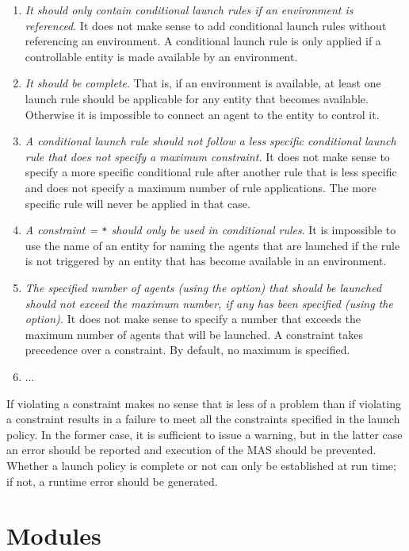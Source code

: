 \documentclass{article}
\begin{document}
\begin{enumerate}
\item \textit{It should only contain conditional launch rules if an environment is referenced}. It does not make sense to add conditional launch rules without referencing an environment. A conditional launch rule is only applied if a controllable  entity is made available by an environment.
\item \textit{It should be complete}. That is, if an environment is available, at least one launch rule should be applicable for any entity that becomes available. Otherwise it is impossible to connect an agent to the entity to control it.
\item \textit{A conditional launch rule should not follow a less specific conditional launch rule that does not specify a maximum constraint.} It does not make sense to specify a more specific conditional rule after another rule that is less specific and does not specify a maximum number of rule applications. The more specific rule will never be applied in that case.
\item \textit{A constraint \name = \texttt{*} should only be used in conditional rules}. It is impossible to use the name of an entity for naming the agents that are launched if the rule is not triggered by an entity that has become available in an environment.
\item \textit{The specified number of agents (using the \nr option) that should be launched should not exceed the maximum number, if any has been specified (using the \maxnr option).} It does not make sense to specify a number that exceeds the maximum number of agents that will be launched. A \maxnr constraint takes precedence over a \nr constraint. By default, no maximum is specified.
\item ...
\end{enumerate}

If violating a constraint makes no sense that is less of a problem than if violating a constraint results in a failure to meet all the constraints specified in the launch policy. In the former case, it is sufficient to issue a warning, but in the latter case an error should be reported and execution of the MAS should be prevented. Whether a launch policy is complete or not can only be established at run time; if not, a runtime error should be generated.

%
%
\section{Modules}
%
\end{document}
